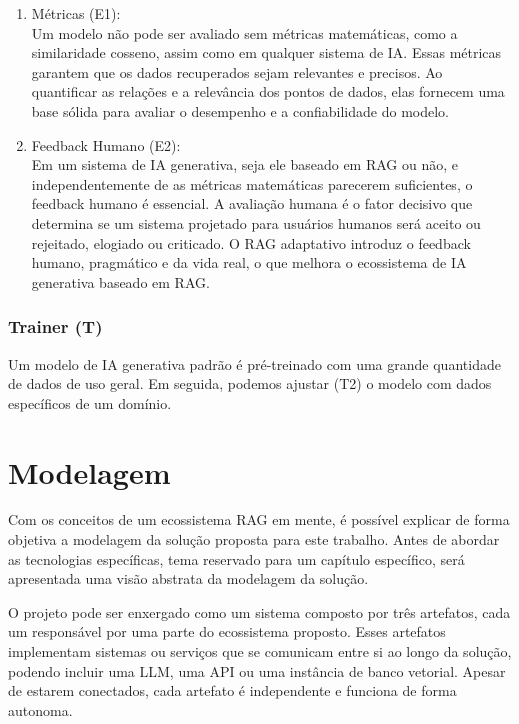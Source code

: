 \documentclass[a4paper, 12pt]{article}
\begin{document}
    \begin{enumerate}
        \item Métricas (E1):\\
        Um modelo não pode ser avaliado sem métricas matemáticas, como a similaridade cosseno, assim como em qualquer sistema de IA. Essas métricas garantem que os dados recuperados sejam relevantes e precisos. Ao quantificar as relações e a relevância dos pontos de dados, elas fornecem uma base sólida para avaliar o desempenho e a confiabilidade do modelo.
        \item Feedback Humano (E2):\\
        Em um sistema de IA generativa, seja ele baseado em RAG ou não, e independentemente de as métricas matemáticas parecerem suficientes, o feedback humano é essencial. A avaliação humana é o fator decisivo que determina se um sistema projetado para usuários humanos será aceito ou rejeitado, elogiado ou criticado. O RAG adaptativo introduz o feedback humano, pragmático e da vida real, o que melhora o ecossistema de IA generativa baseado em RAG.
    \end{enumerate}
    
    \subsubsection{Trainer (T)}

    Um modelo de IA generativa padrão é pré-treinado com uma grande quantidade de dados de uso geral. Em seguida, podemos ajustar (T2) o modelo com dados específicos de um domínio.

    \clearpage

    \section{Modelagem}

    Com os conceitos de um ecossistema RAG em mente, é possível explicar de forma objetiva a modelagem da solução proposta para este trabalho. Antes de abordar as tecnologias específicas, tema reservado para um capítulo específico, será apresentada uma visão abstrata da modelagem da solução.

    O projeto pode ser enxergado como um sistema composto por três artefatos, cada um responsável por uma parte do ecossistema proposto. Esses artefatos implementam sistemas ou serviços que se comunicam entre si ao longo da solução, podendo incluir uma LLM, uma API ou uma instância de banco vetorial. Apesar de estarem conectados, cada artefato é independente e funciona de forma autonoma.
    
\end{document}
